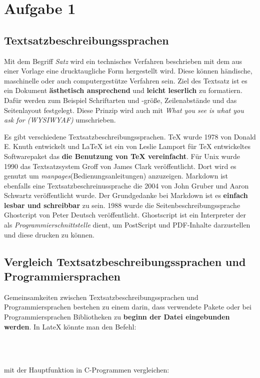 \chapter{Aufgabe 1}
\section{Textsatzbeschreibungssprachen}
Mit dem Begriff \textit{Satz} wird ein technisches Verfahren beschrieben mit dem aus einer Vorlage eine drucktaugliche Form hergestellt wird. Diese können händische, maschinelle oder auch computergestütze Verfahren sein. Ziel des Textsatz ist es ein Dokument \textbf{ästhetisch ansprechend} und \textbf{leicht leserlich} zu formatiern. Dafür werden zum Beispiel Schriftarten und -größe, Zeilenabstände und das Seitenlayout festgelegt. Diese Prinzip wird auch mit \textit{What you see is what you ask for (WYSIWYAF)} umschrieben.\par
Es gibt verschiedene Textsatzbeschreibungssprachen. TeX wurde 1978 von Donald E. Knuth entwickelt und LaTeX ist ein von Leslie Lamport für TeX entwickeltes Softwarepaket das \textbf{die Benutzung von TeX vereinfacht}. Für Unix wurde 1990 das Textsatzsystem Groff von James Clark veröffentlicht. Dort wird es genutzt um \textit{manpages}(Bedienungsanleitungen) anzuzeigen. Markdown ist ebenfalls eine Textsatzbeschreinussprache die 2004 von John Gruber und Aaron Schwartz veröffentlicht wurde. Der Grundgedanke bei Markdown ist es \textbf{einfach lesbar und schreibbar} zu sein. 1988 wurde die Seitenbeschreibungssprache Ghostcript von Peter Deutsch veröffentlicht. Ghostscript ist ein Interpreter der als \textit{Programmierschnittstelle} dient, um PostScript und PDF-Inhalte darzustellen und diese drucken zu können. 

\section{Vergleich Textsatzbeschreibungssprachen und Programmiersprachen}
Gemeinsamkeiten zwischen Textsatzbeschreibungssprachen und Programmiersprachen bestehen zu einem darin, dass verwendete Pakete oder bei Programmiersprachen Bibliotheken zu \textbf{beginn der Datei eingebunden werden}. In LateX könnte man den Befehl:
\begin{lstlisting}
 


\end{lstlisting}

mit der Hauptfunktion in C-Programmen vergleichen:

